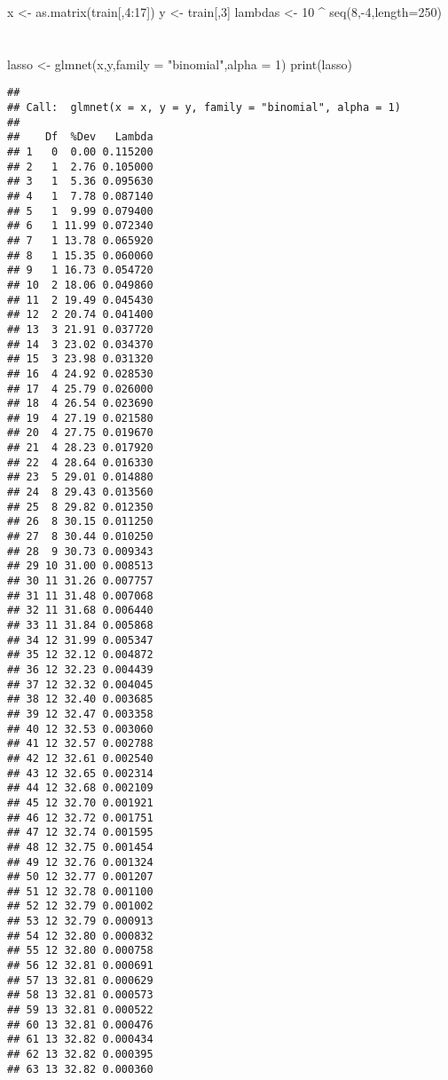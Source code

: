 \documentclass[]{ctexbook}
\newenvironment{Shaded}{\begin{snugshade}}{\end{snugshade}}
\newcommand{\AttributeTok}[1]{\textcolor[rgb]{0.77,0.63,0.00}{#1}}
\newcommand{\DecValTok}[1]{\textcolor[rgb]{0.00,0.00,0.81}{#1}}
\newcommand{\FunctionTok}[1]{\textcolor[rgb]{0.00,0.00,0.00}{#1}}
\newcommand{\NormalTok}[1]{#1}
\newcommand{\OtherTok}[1]{\textcolor[rgb]{0.56,0.35,0.01}{#1}}
\newcommand{\SpecialCharTok}[1]{\textcolor[rgb]{0.00,0.00,0.00}{#1}}
\newcommand{\StringTok}[1]{\textcolor[rgb]{0.31,0.60,0.02}{#1}}
\begin{document}
\begin{Shaded}
\begin{Highlighting}[]
\NormalTok{x }\OtherTok{\textless{}{-}} \FunctionTok{as.matrix}\NormalTok{(train[,}\DecValTok{4}\SpecialCharTok{:}\DecValTok{17}\NormalTok{])}
\NormalTok{y }\OtherTok{\textless{}{-}}\NormalTok{ train[,}\DecValTok{3}\NormalTok{]}
\NormalTok{lambdas }\OtherTok{\textless{}{-}} \DecValTok{10} \SpecialCharTok{\^{}} \FunctionTok{seq}\NormalTok{(}\DecValTok{8}\NormalTok{,}\SpecialCharTok{{-}}\DecValTok{4}\NormalTok{,}\AttributeTok{length=}\DecValTok{250}\NormalTok{)}
\end{Highlighting}
\end{Shaded}

\hypertarget{section}{%
\chapter{}\label{section}}

\begin{Shaded}
\begin{Highlighting}[]
\NormalTok{lasso }\OtherTok{\textless{}{-}} \FunctionTok{glmnet}\NormalTok{(x,y,}\AttributeTok{family =} \StringTok{"binomial"}\NormalTok{,}\AttributeTok{alpha =} \DecValTok{1}\NormalTok{)}
\FunctionTok{print}\NormalTok{(lasso)}
\end{Highlighting}
\end{Shaded}

\begin{verbatim}
## 
## Call:  glmnet(x = x, y = y, family = "binomial", alpha = 1) 
## 
##    Df  %Dev   Lambda
## 1   0  0.00 0.115200
## 2   1  2.76 0.105000
## 3   1  5.36 0.095630
## 4   1  7.78 0.087140
## 5   1  9.99 0.079400
## 6   1 11.99 0.072340
## 7   1 13.78 0.065920
## 8   1 15.35 0.060060
## 9   1 16.73 0.054720
## 10  2 18.06 0.049860
## 11  2 19.49 0.045430
## 12  2 20.74 0.041400
## 13  3 21.91 0.037720
## 14  3 23.02 0.034370
## 15  3 23.98 0.031320
## 16  4 24.92 0.028530
## 17  4 25.79 0.026000
## 18  4 26.54 0.023690
## 19  4 27.19 0.021580
## 20  4 27.75 0.019670
## 21  4 28.23 0.017920
## 22  4 28.64 0.016330
## 23  5 29.01 0.014880
## 24  8 29.43 0.013560
## 25  8 29.82 0.012350
## 26  8 30.15 0.011250
## 27  8 30.44 0.010250
## 28  9 30.73 0.009343
## 29 10 31.00 0.008513
## 30 11 31.26 0.007757
## 31 11 31.48 0.007068
## 32 11 31.68 0.006440
## 33 11 31.84 0.005868
## 34 12 31.99 0.005347
## 35 12 32.12 0.004872
## 36 12 32.23 0.004439
## 37 12 32.32 0.004045
## 38 12 32.40 0.003685
## 39 12 32.47 0.003358
## 40 12 32.53 0.003060
## 41 12 32.57 0.002788
## 42 12 32.61 0.002540
## 43 12 32.65 0.002314
## 44 12 32.68 0.002109
## 45 12 32.70 0.001921
## 46 12 32.72 0.001751
## 47 12 32.74 0.001595
## 48 12 32.75 0.001454
## 49 12 32.76 0.001324
## 50 12 32.77 0.001207
## 51 12 32.78 0.001100
## 52 12 32.79 0.001002
## 53 12 32.79 0.000913
## 54 12 32.80 0.000832
## 55 12 32.80 0.000758
## 56 12 32.81 0.000691
## 57 13 32.81 0.000629
## 58 13 32.81 0.000573
## 59 13 32.81 0.000522
## 60 13 32.81 0.000476
## 61 13 32.82 0.000434
## 62 13 32.82 0.000395
## 63 13 32.82 0.000360
\end{verbatim}
\end{document}
